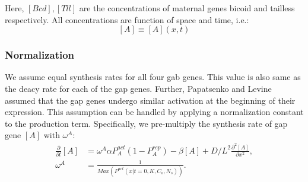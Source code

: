 Here, $[Bcd], [Tll]$ are the concentrations of maternal genes bicoid and tailless respectively. All concentrations are function of space and time, i.e.:
$$[A] \equiv [A](x, t)$$

\subsubsection{Normalization}
We assume equal synthesis rates for all four gab genes. This value is also same as the deacy rate for each of the gap genes. Further, Papatsenko and Levine \cite{papatsenko11} assumed that the gap genes undergo similar activation at the beginning of their expression. This assumption can be handled by applying a normalization constant to the production term. Specifically, we pre-multiply the synthesis rate of gap gene $[A]$ with $\omega^A$:
\begin{align*}
\frac{\partial }{\partial t}[A] &= \omega^A \alpha P_{A}^{act}(1 - P_{A}^{rep}) - \beta [A] + D/L^2 \frac{\partial^2 [A]}{\partial x^2},\\
\omega^A &= \frac{1}{Max(P^{act}(x|t=0,K,C_o,N_s))}.
\end{align*}
